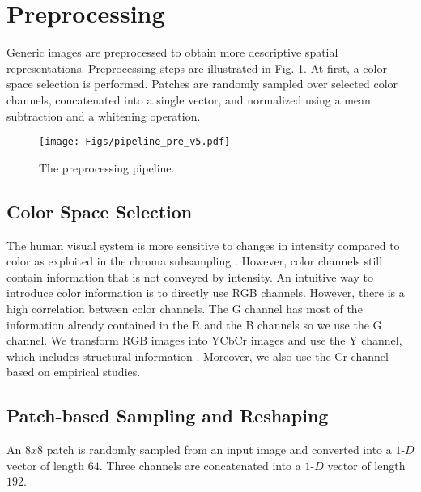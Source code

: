 \documentclass[draftcls,12pt, onecolumn]{IEEEtran}
\begin{document}
 \vspace{-2.5mm}
\section{Preprocessing}
\vspace{-1.0mm}
Generic images are preprocessed to obtain more descriptive spatial representations. Preprocessing steps are illustrated in Fig. \ref{fig:pre}. At first, a color space selection is performed. Patches are randomly sampled over selected color channels, concatenated into a single vector, and normalized using a mean subtraction and a whitening operation. 
\vspace{-2.0mm}
\begin{figure}[htbp!]
\begin{center}
\noindent
  \texttt{[image: Figs/pipeline\_pre\_v5.pdf]}
	\vspace{-1.5mm}
    \caption{The preprocessing pipeline.}
  \label{fig:pre}
\end{center}
\vspace{-10.0mm}
\end{figure}
\subsection{Color Space Selection}
The human visual system is more sensitive to changes in intensity compared to color as exploited in the chroma subsampling \cite{lamb2001}. However, color channels still contain  information that is not conveyed by intensity. An intuitive way to introduce color information is to directly use RGB channels. However, there is a high correlation between color channels. The G channel has most of the information already contained in the R and the B channels \cite{tkalcic2003colour} so we use the G channel. We transform RGB images into YCbCr images and use the Y channel, which includes structural information \cite{wang2004image}. Moreover, we also use the Cr channel based on empirical studies.
\vspace{-4.5mm}
\subsection{Patch-based Sampling and Reshaping}
\vspace{-1.0mm}
An $8x8$ patch is randomly sampled from an input image and converted into a $1$-$D$ vector of length $64$. Three channels are concatenated into a $1$-$D$ vector of length $192$. 
\vspace{-4.5mm}
\end{document}
